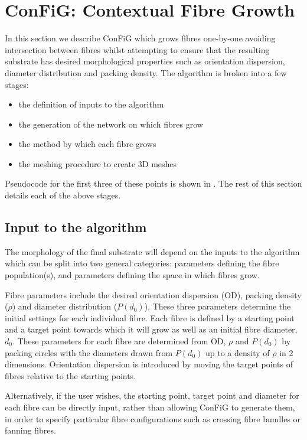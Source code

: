 \section{ConFiG: Contextual Fibre Growth}
\label{sec:fibre_growth_algorithm}
In this section we describe ConFiG  which grows fibres one-by-one avoiding intersection between fibres whilst attempting to ensure that the resulting substrate has desired morphological properties such as orientation dispersion, diameter distribution and packing density.
The algorithm is broken into a few stages:\vspace{-1em}
\begin{itemize}
\item the definition of inputs to the algorithm
\item the generation of the network on which fibres grow
\item the method by which each fibre grows
\item the meshing procedure to create 3D meshes
\end{itemize}
Pseudocode for the first three of these points is shown in . The rest of this section details each of the above stages.

\subsection{Input to the algorithm}
\label{sec:input}
The morphology of the final substrate will depend on the inputs to the algorithm which can be split into two general categories: parameters defining the fibre population(s), and parameters defining the space in which fibres grow.

Fibre parameters include the desired orientation dispersion (OD), packing density ($\rho$) and diameter distribution ($P(d_0)$).
These three parameters determine the initial settings for each individual fibre.
Each fibre is defined by a starting point and a target point towards which it will grow as well as an initial fibre diameter, $d_0$.
These parameters for each fibre are determined from OD, $\rho$ and $P(d_0)$ by packing circles with the diameters drawn from $P(d_0)$ up to a density of $\rho$ in 2 dimensions. Orientation dispersion is introduced by moving the target points of fibres relative to the starting points. %

Alternatively, if the user wishes, the starting point, target point and diameter for each fibre can be directly input, rather than allowing ConFiG to generate them, in order to specify particular fibre configurations such as crossing fibre bundles or fanning fibres.

